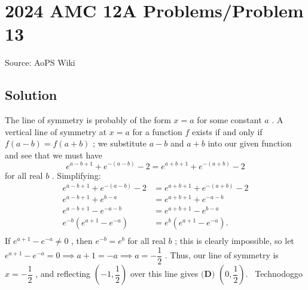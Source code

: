 \documentclass[12pt]{article}
\begin{document}
\section*{{2024 AMC 12A Problems/Problem 13}}
Source: AoPS Wiki

\subsection*{Solution}
The line of symmetry is probably of the form $x=a$ for some constant $a$ . A vertical line of symmetry at $x=a$ for a function $f$ exists if and only if $f(a-b)=f(a+b)$ ; we substitute $a-b$ and $a+b$ into our given function and see that we must have \[e^{a-b+1}+e^{-(a-b)}-2=e^{a+b+1}+e^{-(a+b)}-2\] for all real $b$ . Simplifying: \begin{align*}
e^{a-b+1}+e^{-(a-b)}-2&=e^{a+b+1}+e^{-(a+b)}-2 \\
e^{a-b+1}+e^{b-a}&=e^{a+b+1}+e^{-a-b} \\
e^{a-b+1}-e^{-a-b}&=e^{a+b+1}-e^{b-a} \\
e^{-b}\left(e^{a+1}-e^{-a}\right)&=e^b\left(e^{a+1}-e^{-a}\right). \\
\end{align*} If $e^{a+1}-e^{-a}\neq0$ , then $e^{-b}=e^b$ for all real $b$ ; this is clearly impossible, so let $e^{a+1}-e^{-a}=0\implies a+1=-a\implies a=-\dfrac12$ . Thus, our line of symmetry is $x=-\dfrac12$ , and reflecting $\left(-1,\dfrac12\right)$ over this line gives $\boxed{\textbf{(D) }\left(0,\dfrac12\right)}.$ ~Technodoggo
\end{document}
